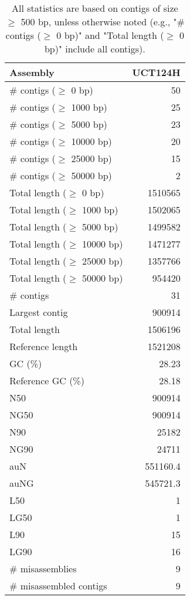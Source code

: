 \documentclass[12pt,a4paper]{article}
\begin{document}
\begin{table}[ht]
\begin{center}
\caption{All statistics are based on contigs of size $\geq$ 500 bp, unless otherwise noted (e.g., "\# contigs ($\geq$ 0 bp)" and "Total length ($\geq$ 0 bp)" include all contigs).}
\begin{tabular}{|l*{1}{|r}|}
\hline
Assembly & UCT124H \\ \hline
\# contigs ($\geq$ 0 bp) & 50 \\ \hline
\# contigs ($\geq$ 1000 bp) & 25 \\ \hline
\# contigs ($\geq$ 5000 bp) & 23 \\ \hline
\# contigs ($\geq$ 10000 bp) & 20 \\ \hline
\# contigs ($\geq$ 25000 bp) & 15 \\ \hline
\# contigs ($\geq$ 50000 bp) & 2 \\ \hline
Total length ($\geq$ 0 bp) & 1510565 \\ \hline
Total length ($\geq$ 1000 bp) & 1502065 \\ \hline
Total length ($\geq$ 5000 bp) & 1499582 \\ \hline
Total length ($\geq$ 10000 bp) & 1471277 \\ \hline
Total length ($\geq$ 25000 bp) & 1357766 \\ \hline
Total length ($\geq$ 50000 bp) & 954420 \\ \hline
\# contigs & 31 \\ \hline
Largest contig & 900914 \\ \hline
Total length & 1506196 \\ \hline
Reference length & 1521208 \\ \hline
GC (\%) & 28.23 \\ \hline
Reference GC (\%) & 28.18 \\ \hline
N50 & 900914 \\ \hline
NG50 & 900914 \\ \hline
N90 & 25182 \\ \hline
NG90 & 24711 \\ \hline
auN & 551160.4 \\ \hline
auNG & 545721.3 \\ \hline
L50 & 1 \\ \hline
LG50 & 1 \\ \hline
L90 & 15 \\ \hline
LG90 & 16 \\ \hline
\# misassemblies & 9 \\ \hline
\# misassembled contigs & 9 \\ \hline

\end{tabular}
\end{center}
\end{table}
\end{document}
